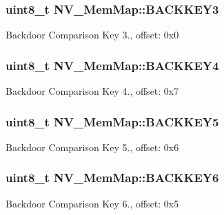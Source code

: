 \subsubsection[{B\+A\+C\+K\+K\+E\+Y3}]{\setlength{\rightskip}{0pt plus 5cm}uint8\+\_\+t N\+V\+\_\+\+Mem\+Map\+::\+B\+A\+C\+K\+K\+E\+Y3}\label{struct_n_v___mem_map_a836e107cd6936ce8acd9279af7e9657e}
Backdoor Comparison Key 3., offset\+: 0x0 \hypertarget{struct_n_v___mem_map_ae4e87676d4d9881d1d60af4176b6d6f5}{}
\subsubsection[{B\+A\+C\+K\+K\+E\+Y4}]{\setlength{\rightskip}{0pt plus 5cm}uint8\+\_\+t N\+V\+\_\+\+Mem\+Map\+::\+B\+A\+C\+K\+K\+E\+Y4}\label{struct_n_v___mem_map_ae4e87676d4d9881d1d60af4176b6d6f5}
Backdoor Comparison Key 4., offset\+: 0x7 \hypertarget{struct_n_v___mem_map_a46e84393478a41f6958c4f382cad11b7}{}
\subsubsection[{B\+A\+C\+K\+K\+E\+Y5}]{\setlength{\rightskip}{0pt plus 5cm}uint8\+\_\+t N\+V\+\_\+\+Mem\+Map\+::\+B\+A\+C\+K\+K\+E\+Y5}\label{struct_n_v___mem_map_a46e84393478a41f6958c4f382cad11b7}
Backdoor Comparison Key 5., offset\+: 0x6 \hypertarget{struct_n_v___mem_map_aa2013cbf54568a1ed52cd6205b4b0b35}{}
\subsubsection[{B\+A\+C\+K\+K\+E\+Y6}]{\setlength{\rightskip}{0pt plus 5cm}uint8\+\_\+t N\+V\+\_\+\+Mem\+Map\+::\+B\+A\+C\+K\+K\+E\+Y6}\label{struct_n_v___mem_map_aa2013cbf54568a1ed52cd6205b4b0b35}
Backdoor Comparison Key 6., offset\+: 0x5 \hypertarget{struct_n_v___mem_map_a398eb38f0e2b4a9da6562e42ed7a40b3}{}
